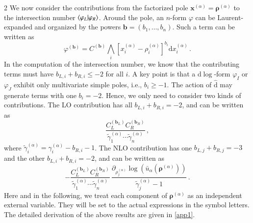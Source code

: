 \documentclass[fleqn]{2023SCGE}
\newcommand{\nd}{\mathrm{d}}
\newcommand{\nds}{\hat{\mathrm{d}}}
\begin{document}
\begin{multicols}{2}
We now consider the contributions from the factorized pole $\bm{x}^{(\alpha)}=\bm{\rho}^{(\alpha)}$ to the intersection number $\braket{\varphi_L|\varphi_R}$. Around the pole, an $n$-form $\varphi$ can be Laurent-expanded and organized by the powers $\bm{b}=(b_1,\ldots,b_n)$. Such a term can be written as
\begin{equation}
    \varphi^{(\bm{b})} = C^{(\bm{b})} \bigwedge_i  \left[ x_i^{(\alpha)} - \rho_i^{(\alpha)} \right]^{b_{i}} \nd x^{(\alpha)}_i \,. \label{eq:phib}
\end{equation}
In the computation of the intersection number, we know that the contributing terms must have $b_{L,i}+b_{R,i} \leq -2$ for all $i$.
%
A key point is that a $\nd \log$-form $\varphi_I$ or $\varphi_J$ exhibit only multivariate simple poles, i.e., $b_{i} \geq -1$. The action of $\nds$ may generate terms with one $b_i = -2$. Hence, we only need to consider two kinds of contributions. The LO contribution \cite{ Mizera:2019ose} has all $b_{L,i}+b_{R,i}=-2$, and can be written as
\begin{equation}
	\frac{C_L^{(\bm{b}_L)} C_R^{(\bm{b}_R)}}{ \tilde{\gamma}^{(\alpha)}_1 \cdots \tilde{\gamma}^{(\alpha)}_n} \,, \label{eq:LP}
\end{equation}
where $\tilde{\gamma}^{(\alpha)}_i=\gamma^{(\alpha)}_i - b_{R,i} - 1$.
The NLO contribution has one $b_{L,j}+b_{R,j}=-3$ and the other $b_{L,i}+b_{R,i}=-2$, and can be written as
\begin{equation}
	-\frac{C_L^{(\bm{b}_L)} C_R^{(\bm{b}_R)}}{\tilde{\gamma}^{(\alpha)}_1 \cdots \tilde{\gamma}^{(\alpha)}_n} \, \frac{\partial_{\rho^{(\alpha)}_j} \log \left(\bar{u}_\alpha(\bm{\rho}^{(\alpha)})\right)}{\tilde{\gamma}_j^{(\alpha)}-1 } \,. \label{eq:NLP}
\end{equation}
Here and in the following, we treat each component of $\bm{\rho}^{(\alpha)}$ as an independent external variable. They will be set to the actual expressions in the symbol letters. {  The detailed derivation of the above results are given in \ref{app1}.}


\end{multicols}
\end{document}
